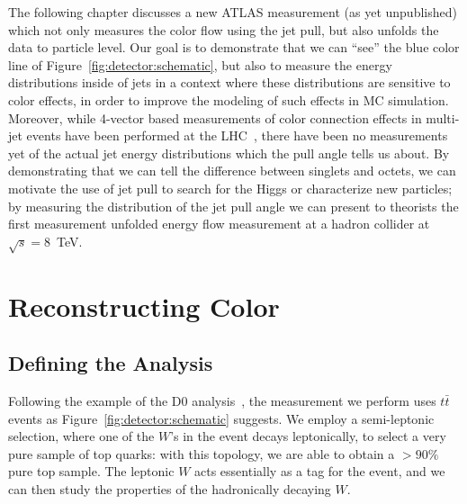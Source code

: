 





The following chapter discusses a new ATLAS measurement (as yet unpublished) which not only measures the color flow using the jet pull, but also unfolds the data to particle level. Our goal is to demonstrate that we can ``see'' the blue color line of Figure~\ref{fig:detector:schematic}, but also to measure the energy distributions inside of jets in a context where these distributions are sensitive to color effects, in order to improve the modeling of such effects in MC simulation. Moreover, while 4-vector based measurements of color connection effects in multi-jet events have been performed at the LHC~\cite{Chatrchyan:2013fha}, there have been no measurements yet of the actual jet energy distributions which the pull angle tells us about. By demonstrating that we can tell the difference between singlets and octets, we can motivate the use of jet pull to search for the Higgs or characterize new particles; by measuring the distribution of the jet pull angle we can present to theorists the first measurement unfolded energy flow measurement at a hadron collider at $\sqrt{s} = 8$~TeV.


\section{Reconstructing Color}

\subsection{Defining the Analysis}

Following the example of the D0 analysis~\cite{Abazov:2011vh}, the measurement we perform uses $t\bar{t}$ events as Figure~\ref{fig:detector:schematic} suggests. We employ a semi-leptonic selection, where one of the $W$'s in the event decays leptonically, to select a very pure sample of top quarks: with this topology, we are able to obtain a $>90\%$ pure top sample. The leptonic $W$ acts essentially as a tag for the event, and we can then study the properties of the hadronically decaying $W$.

